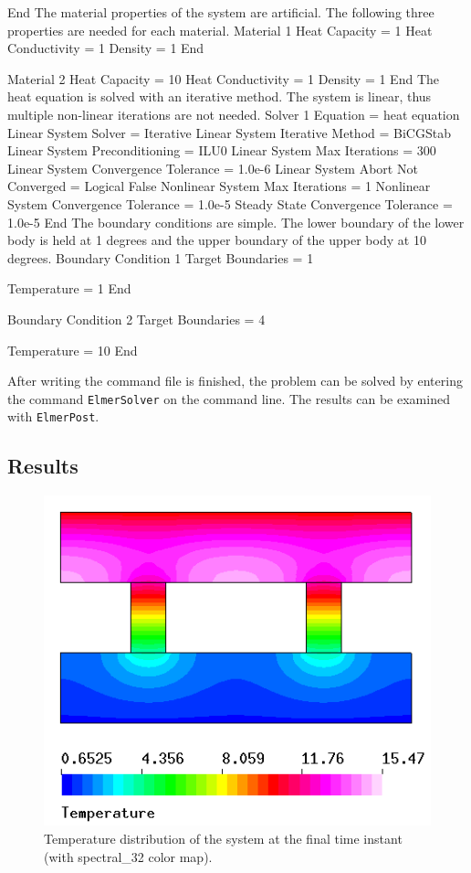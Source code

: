 End
\ttend
%
The material properties of the system are artificial. The following
three properties are needed for each material.
%
\ttbegin
Material 1
  Heat Capacity = 1
  Heat Conductivity = 1
  Density = 1
End

Material 2
  Heat Capacity = 10
  Heat Conductivity = 1
  Density = 1
End
\ttend
%
The heat equation is solved with an iterative method. The system is
linear, thus multiple non-linear iterations are not needed.
%
\ttbegin
Solver 1
  Equation = heat equation
  Linear System Solver = Iterative
  Linear System Iterative Method = BiCGStab
  Linear System Preconditioning = ILU0
  Linear System Max Iterations = 300
  Linear System Convergence Tolerance = 1.0e-6
  Linear System Abort Not Converged = Logical False
  Nonlinear System Max Iterations = 1
  Nonlinear System Convergence Tolerance = 1.0e-5
  Steady State Convergence Tolerance = 1.0e-5
End
\ttend
%
The boundary conditions are simple. The lower boundary of the lower
body is held at 1 degrees and the upper boundary of the upper body at
10 degrees.
%
\ttbegin
Boundary Condition 1
  Target Boundaries = 1

  Temperature = 1
End

Boundary Condition 2
  Target Boundaries = 4

  Temperature = 10
End
\ttend

After writing the command file is finished, the problem can be solved
by entering the command \texttt{ElmerSolver} on the command line. The
results can be examined with \texttt{ElmerPost}.


\subsection*{Results}

\begin{figure}
\begin{center}
  \includegraphics[height=0.5\textwidth]{heat.png}
\end{center}
\caption{Temperature distribution of the system at the final time
  instant (with spectral\_32 color map).}
\label{fig:temp_passive}
\end{figure}
 
